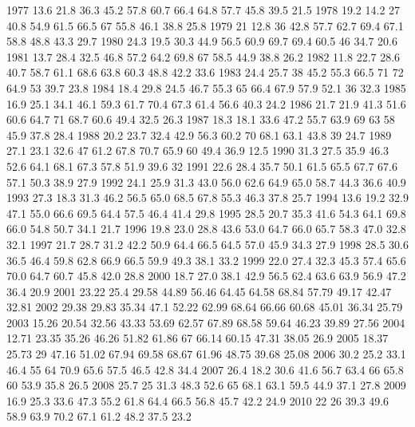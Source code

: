 1977	13.6	21.8	36.3	45.2	57.8	60.7	66.4	64.8	57.7	45.8	39.5	21.5
1978	19.2	14.2	27	40.8	54.9	61.5	66.5	67	55.8	46.1	38.8	25.8
1979	21	12.8	36	42.8	57.7	62.7	69.4	67.1	58.8	48.8	43.3	29.7
1980	24.3	19.5	30.3	44.9	56.5	60.9	69.7	69.4	60.5	46	34.7	20.6
1981	13.7	28.4	32.5	46.8	57.2	64.2	69.8	67	58.5	44.9	38.8	26.2
1982	11.8	22.7	28.6	40.7	58.7	61.1	68.6	63.8	60.3	48.8	42.2	33.6
1983	24.4	25.7	38	45.2	55.3	66.5	71	72	64.9	53	39.7	23.8
1984	18.4	29.8	24.5	46.7	55.3	65	66.4	67.9	57.9	52.1	36	32.3
1985	16.9	25.1	34.1	46.1	59.3	61.7	70.4	67.3	61.4	56.6	40.3	24.2
1986	21.7	21.9	41.3	51.6	60.6	64.7	71	68.7	60.6	49.4	32.5	26.3
1987	18.3	18.1	33.6	47.2	55.7	63.9	69	63	58	45.9	37.8	28.4
1988	20.2	23.7	32.4	42.9	56.3	60.2	70	68.1	63.1	43.8	39	24.7
1989	27.1	23.1	32.6	47	61.2	67.8	70.7	65.9	60	49.4	36.9	12.5
1990	31.3	27.5	35.9	46.3	52.6	64.1	68.1	67.3	57.8	51.9	39.6	32
1991	22.6	28.4	35.7	50.1	61.5	65.5	67.7	67.6	57.1	50.3	38.9	27.9
1992	24.1	25.9	31.3	43.0	56.0	62.6	64.9	65.0	58.7	44.3	36.6	40.9
1993	27.3	18.3	31.3	46.2	56.5	65.0	68.5	67.8	55.3	46.3	37.8	25.7
1994	13.6	19.2	32.9	47.1	55.0	66.6	69.5	64.4	57.5	46.4	41.4	29.8
1995	28.5	20.7	35.3	41.6	54.3	64.1	69.8	66.0	54.8	50.7	34.1	21.7
1996	19.8	23.0	28.8	43.6	53.0	64.7	66.0	65.7	58.3	47.0	32.8	32.1
1997	21.7	28.7	31.2	42.2	50.9	64.4	66.5	64.5	57.0	45.9	34.3	27.9
1998	28.5	30.6	36.5	46.4	59.8	62.8	66.9	66.5	59.9	49.3	38.1	33.2
1999	22.0	27.4	32.3	45.3	57.4	65.6	70.0	64.7	60.7	45.8	42.0	28.8
2000	18.7	27.0	38.1	42.9	56.5	62.4	63.6	63.9	56.9	47.2	36.4	20.9
2001	23.22	25.4	29.58	44.89	56.46	64.45	64.58	68.84	57.79	49.17	42.47	32.81
2002	29.38	29.83	35.34	47.1	52.22	62.99	68.64	66.66	60.68	45.01	36.34	25.79
2003	15.26	20.54	32.56	43.33	53.69	62.57	67.89	68.58	59.64	46.23	39.89	27.56
2004	12.71	23.35	35.26	46.26	51.82	61.86	67	66.14	60.15	47.31	38.05	26.9
2005	18.37	25.73	29	47.16	51.02	67.94	69.58	68.67	61.96	48.75	39.68	25.08
2006	30.2	25.2	33.1	46.4	55	64	70.9	65.6	57.5	46.5	42.8	34.4
2007	26.4	18.2	30.6	41.6	56.7	63.4	66	65.8	60	53.9	35.8	26.5
2008	25.7	25	31.3	48.3	52.6	65	68.1	63.1	59.5	44.9	37.1	27.8
2009	16.9	25.3	33.6	47.3	55.2	61.8	64.4	66.5	56.8	45.7	42.2	24.9
2010	22	26	39.3	49.6	58.9	63.9	70.2	67.1	61.2	48.2	37.5	23.2
